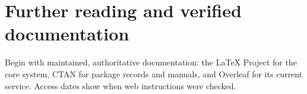 \chapter*{Further reading and verified documentation}

Begin with maintained, authoritative documentation: the \LaTeX{} Project for the
core system, CTAN for package records and manuals, and Overleaf for its current
service. Access dates show when web instructions were checked.

\begingroup
\footnotesize
\setlength{\bibitemsep}{0pt}
\printbibliography[heading=none]
\endgroup
